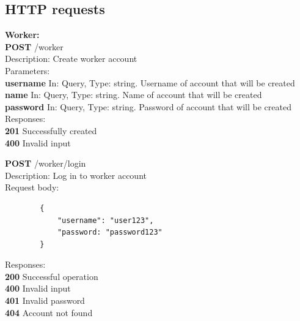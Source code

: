\documentclass[11pt,a4paper,pdftex]{article}
\begin{document}
\subsection{HTTP requests}
\textbf{Worker:}\\
\hspace*{1em}\textbf{POST} /worker\\
\hspace*{2em}Description: Create worker account\\
\hspace*{2em}Parameters:\\
\hspace*{3em}\textbf{username} In: Query, Type: string. Username of account that will be created\\
\hspace*{3em}\textbf{name} In: Query, Type: string. Name of account that will be created\\
\hspace*{3em}\textbf{password} In: Query, Type: string. Password of account that will be created\\
\hspace*{2em}Responses:\\
\hspace*{3em}\textbf{201} Successfully created\\
\hspace*{3em}\textbf{400} Invalid input

\hspace*{1em}\textbf{POST} /worker/login\\
\hspace*{2em}Description: Log in to worker account\\
\hspace*{2em}Request body:
\begin{verbatim}
        {
            "username": "user123",
            "password: "password123"
        }
\end{verbatim}
\hspace*{2em}Responses:\\
\hspace*{3em}\textbf{200} Successful operation\\
\hspace*{3em}\textbf{400} Invalid input\\
\hspace*{3em}\textbf{401} Invalid password\\
\hspace*{3em}\textbf{404} Account not found
\end{document}
